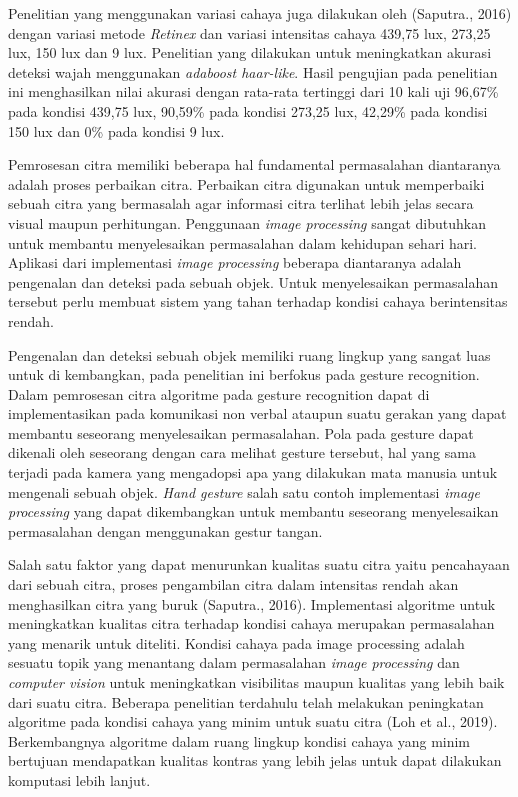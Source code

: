 Penelitian yang menggunakan variasi cahaya juga dilakukan oleh (Saputra., 2016) dengan variasi metode \textit{Retinex} dan variasi intensitas cahaya 439,75 lux, 273,25 lux, 150 lux dan 9 lux. Penelitian yang dilakukan untuk meningkatkan akurasi deteksi wajah menggunakan \textit{adaboost haar-like}. Hasil pengujian pada penelitian ini menghasilkan nilai akurasi dengan rata-rata tertinggi dari 10 kali uji 96,67\% pada kondisi 439,75 lux, 90,59\% pada kondisi 273,25 lux, 42,29\% pada kondisi 150 lux dan 0\% pada kondisi 9 lux.

Pemrosesan citra memiliki beberapa hal fundamental permasalahan diantaranya adalah proses perbaikan citra. Perbaikan citra digunakan untuk memperbaiki sebuah citra yang bermasalah agar informasi citra terlihat lebih jelas secara visual maupun perhitungan. Penggunaan \emph{image processing} sangat dibutuhkan untuk membantu menyelesaikan permasalahan dalam kehidupan sehari hari. Aplikasi dari implementasi \emph{image processing} beberapa diantaranya adalah pengenalan dan deteksi pada sebuah objek. Untuk menyelesaikan permasalahan tersebut perlu membuat sistem yang tahan terhadap kondisi cahaya berintensitas rendah.

Pengenalan dan deteksi sebuah objek memiliki ruang lingkup yang sangat luas untuk di kembangkan, pada penelitian ini berfokus pada gesture recognition.
Dalam pemrosesan citra algoritme pada gesture recognition dapat di implementasikan pada komunikasi non verbal ataupun suatu gerakan yang dapat membantu seseorang menyelesaikan permasalahan. Pola pada gesture dapat dikenali oleh seseorang dengan cara melihat gesture tersebut, hal yang sama terjadi pada kamera yang mengadopsi apa yang dilakukan mata manusia untuk mengenali sebuah objek. 
\emph{Hand gesture} salah satu contoh implementasi \emph{image processing} yang dapat dikembangkan untuk membantu seseorang menyelesaikan permasalahan dengan menggunakan gestur tangan. 

Salah satu faktor yang dapat menurunkan kualitas suatu citra yaitu pencahayaan dari sebuah citra, proses pengambilan citra dalam intensitas rendah akan menghasilkan citra yang buruk (Saputra., 2016).
Implementasi algoritme untuk meningkatkan kualitas citra terhadap kondisi cahaya merupakan permasalahan yang menarik untuk diteliti.
Kondisi cahaya pada image processing adalah sesuatu topik yang menantang dalam permasalahan \emph{image processing} dan \emph{computer vision} untuk meningkatkan visibilitas maupun kualitas yang lebih baik dari suatu citra. 
Beberapa penelitian terdahulu telah melakukan peningkatan algoritme pada kondisi cahaya yang minim untuk suatu citra (Loh et al., 2019). 
Berkembangnya algoritme dalam ruang lingkup kondisi cahaya yang minim bertujuan mendapatkan kualitas kontras yang lebih jelas untuk dapat dilakukan komputasi lebih lanjut.


